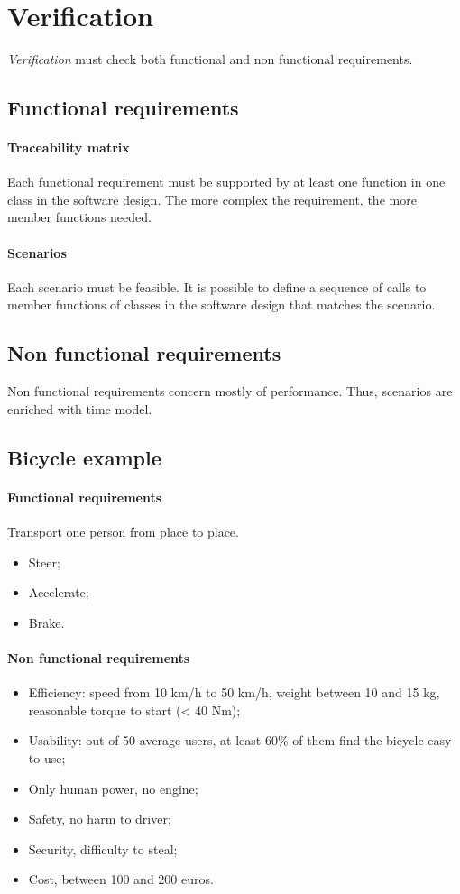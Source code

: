 \section{Verification}
\emph{Verification} must check both functional and non functional requirements.

\subsection{Functional requirements}
\paragraph{Traceability matrix}
Each functional requirement must be supported by at least one function in one class in the software design. The more complex the requirement, the more member functions needed.

\paragraph{Scenarios}
Each scenario must be feasible. It is possible to define a sequence of calls to member functions of classes in the software design that matches the scenario.

\subsection{Non functional requirements}
Non functional requirements concern mostly of performance. Thus, scenarios are enriched with time model.

\subsection*{Bicycle example}
\paragraph{Functional requirements}
Transport one person from place to place.
\begin{itemize}
\item Steer;
\item Accelerate;
\item Brake.
\end{itemize}

\paragraph{Non functional requirements}
\begin{itemize}
\item Efficiency: speed from 10 km/h to 50 km/h, weight between 10 and 15 kg, reasonable torque to start (< 40 Nm);
\item Usability: out of 50 average users, at least 60\% of them find the bicycle easy to use;
\item Only human power, no engine;
\item Safety, no harm to driver;
\item Security, difficulty to steal;
\item Cost, between 100 and 200 euros.
\end{itemize}

